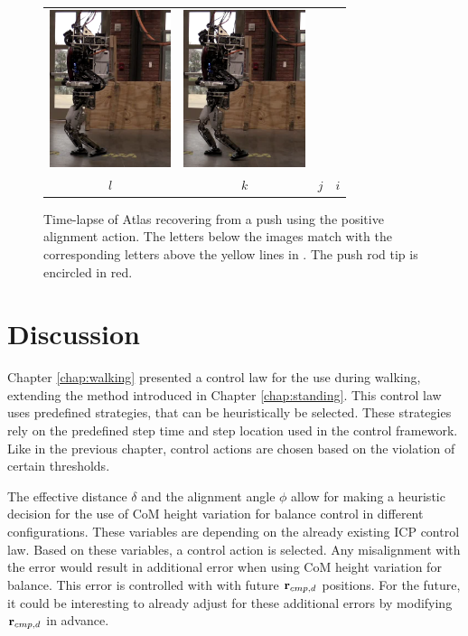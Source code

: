 \begin{figure}
\begin{tabular}{cccc}
    \includegraphics[width=1.4in]{STYLESTUFF/atw10} &
    \includegraphics[width=1.4in]{STYLESTUFF/atw9} \\
    $l$ & $k$ & $j$ & $i$ 
  \end{tabular}
  \caption{Time-lapse of Atlas recovering from a push using the positive alignment action. The letters below the images match with the corresponding letters above the yellow lines in . The push rod tip is encircled in red.}
  \label{fig:atw}
\end{figure}
\section{Discussion}
Chapter \ref{chap:walking} presented a control law for the use during walking, extending the method introduced in Chapter \ref{chap:standing}. This control law uses predefined strategies, that can be heuristically be selected. These strategies rely on the predefined step time and step location used in the control framework. Like in the previous chapter, control actions are chosen based on the violation of certain thresholds. 

The effective distance $\delta$ and the alignment angle $\phi$ allow for making a heuristic decision for the use of \ac{CoM} height variation for balance control in different configurations. These variables are depending on the already existing \ac{ICP} control law. Based on these variables, a control action is selected. Any misalignment with the error would result in additional error when using \ac{CoM} height variation for balance. This error is controlled with with future $\mathbf{r}_{cmp,d}$ positions. For the future, it could be interesting to already adjust for these additional errors by modifying $\mathbf{r}_{cmp,d}$ in advance.

